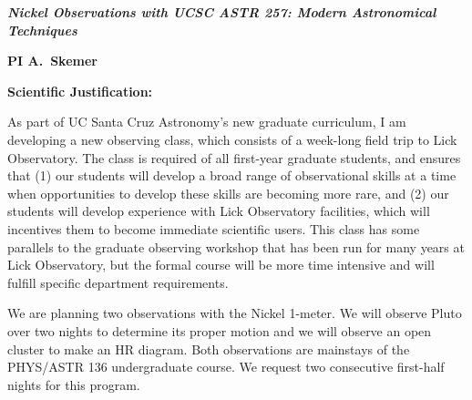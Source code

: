 \documentclass[12pt]{article}
\begin{document}
\noindent
\centerline{\bf \textit{Nickel Observations with UCSC ASTR 257: Modern Astronomical Techniques}} 
\centerline{\bf PI A.\ Skemer}

\vskip 15pt

\centerline{\bf  Scientific Justification: }

As part of UC Santa Cruz Astronomy's new graduate curriculum, I am developing a new observing class, which consists of a week-long field trip to Lick Observatory.  The class is required of all first-year graduate students, and ensures that (1) our students will develop a broad range of observational skills at a time when opportunities to develop these skills are becoming more rare, and (2) our students will develop experience with Lick Observatory facilities, which will incentives them to become immediate scientific users.  This class has some parallels to the graduate observing workshop that has been run for many years at Lick Observatory, but the formal course will be more time intensive and will fulfill specific department requirements.

We are planning two observations with the Nickel 1-meter.  We will observe Pluto over two nights to determine its proper motion and we will observe an open cluster to make an HR diagram.  Both observations are mainstays of the PHYS/ASTR 136 undergraduate course.  We request two consecutive first-half nights for this program.

\newpage
\end{document}
